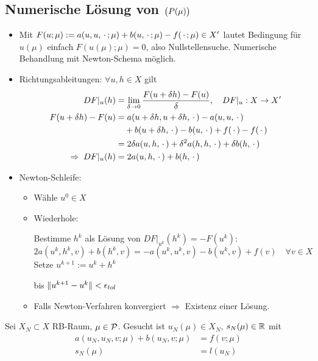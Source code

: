 \subsection*{Numerische Lösung von $\big(P(\mu)\big)$}

\begin{itemize}
	\item Mit $F(u;\mu) := a(u,u,\,\cdot\,;\mu) + b(u,\,\cdot\,;\mu) - f(\,\cdot\,;\mu) \in X'$ lautet Bedingung für $u(\mu)$ einfach $F(u(\mu);\mu) = 0$, also Nullstellensuche.
		Numerische Behandlung mit Newton-Schema möglich.
	\item Richtungsableitungen: $\forall u,h \in X$ gilt
		\begin{align*}
			DF|_u(h) &= \lim_{\delta \to 0} \frac{F(u + \delta h)-F(u)}{\delta}, \quad DF|_u : X \to X'\\
			F(u+\delta h)-F(u) &= a(u+\delta h, u + \delta h,\,\cdot\,) - a(u,u,\,\cdot\,)\\
			&\quad + b(u+\delta h,\,\cdot\,)-b(u,\,\cdot\,)+f(\,\cdot\,)-f(\,\cdot\,)\\
			&= 2 \delta a(u,h,\,\cdot\,)+\delta^2 a(h,h,\,\cdot\,)+\delta b(h,\,\cdot\,)\\
			\Rightarrow \; DF|_u(h) &= 2a(u,h,\,\cdot\,)+b(h,\,\cdot\,)
		\end{align*}
	\item Newton-Schleife:
		\begin{itemize}
			\item Wähle $u^0 \in X$
			\item Wiederhole:

				\quad Bestimme $h^k$ als Lösung von $DF|_{u^k}(h^k) = -F(u^k)$:
				\[
					2a(u^k,h^k,v)+b(h^k,v) = -a(u^k,u^k,v)-b(u^k,v)+f(v) \quad \forall v \in X
				\]
				\quad Setze $u^{k+1} := u^k + h^k$

				bis $\|u^{k+1}-u^k\| < \epsilon_{tol}$
			\item Falls Newton-Verfahren konvergiert $\Rightarrow$ Existenz einer Lösung.
		\end{itemize}
\end{itemize}

\begin{defn} \label{5.2}
	Sei $X_N \subset X$ RB-Raum, $\mu \in \mathcal{P}$. Gesucht ist $u_N(\mu) \in X_N$, $s_N(\mu) \in \mathbb{R}$ mit
	\begin{align*}
		a(u_N,u_N,v;\mu)+b(u_N,v;\mu)&=f(v;\mu)\\
		s_N(\mu)&=l(u_N)
	\end{align*}
\end{defn}

